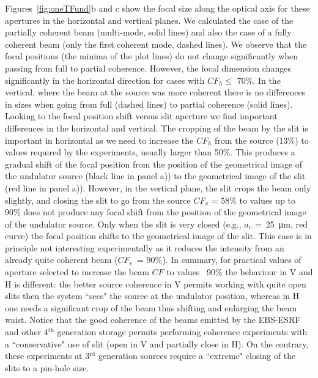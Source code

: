 \documentclass[9pt,twocolumn,twoside]{osajnl}
\begin{document}

Figures~\ref{fig:oneTFund}b and c show the focal size along the optical axis for these apertures in the horizontal and vertical planes. We calculated the case of the partially coherent beam (multi-mode, solid lines) and also the case of a fully coherent beam (only the first coherent mode, dashed lines). We observe that the focal positions (the minima of the plot lines) do not change significantly when passing from full to partial coherence. However, the focal dimension changes significantly in the horizontal direction for cases with $CF_h\le$ 70\%. In the vertical, where the beam at the source was more coherent there is no differences in sizes when going from full (dashed lines) to partial coherence (solid lines). Looking to the focal position shift versus slit aperture we find important differences in the horizontal and vertical. The cropping of the beam by the slit is important in horizontal as we need to increase the $CF_h$ from the source (13\%) to values required by the experiments, usually larger than 50\%. This produces a gradual shift of the focal position from the position of the geometrical image of the undulator source (black line in panel a)) to the geometrical image of the slit (red line in panel a)). However, in the vertical plane, the slit crops the beam only slightly, and closing the slit to go from the source $CF_v$ = 58\% to values up to 90\% does not produce any focal shift from the position of the geometrical image of the undulator source. Only when the slit is very closed (e.g., $a_v$ =~\SI{25}{\micro\meter}, red curve) the focal position shifts to the geometrical image of the slit. This case is in principle not interesting experimentally as it reduces the intensity from an already quite coherent beam ($CF_v$~= 90\%).
In summary, for practical values of aperture selected to increase the beam $CF$ to values ~90\% the behaviour in V and H is different: the better source coherence in V permits working with quite open slits then the system ``sees" the source at the undulator position, whereas in H one needs a significant crop of the beam thus shifting and enlarging the beam waist. Notice that the good coherence of the beams emitted by the EBS-ESRF and other 4$^{\text{th}}$ generation storage permits performing coherence experiments with a ``conservative" use of slit (open in V and partially close in H). On the contrary, these experiments at 3$^{\text{rd}}$ generation sources require a ``extreme" closing of the slits to a pin-hole size.      
\end{document}
